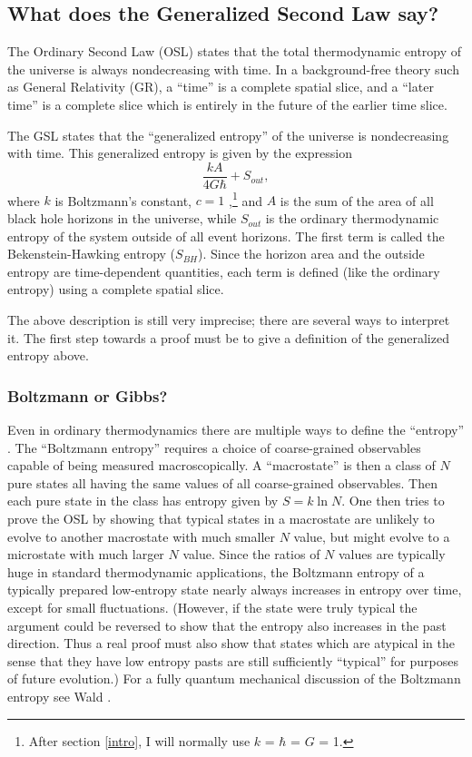 \documentclass[12pt]{article}
\begin{document}
\subsection{What does the Generalized Second Law say?}\label{def}

The Ordinary Second Law (OSL) states that the total thermodynamic entropy of the universe is always nondecreasing with time.  In a background-free theory such as General Relativity (GR), a ``time'' is a complete spatial slice, and a ``later time'' is a complete slice which is entirely in the future of the earlier time slice.

The GSL states that the ``generalized entropy'' of the universe is nondecreasing with time.  This generalized entropy is given by the expression
\begin{equation}\label{Gen}
\frac{kA}{4G \hbar} + S_{out},
\end{equation}
where $k$ is Boltzmann's constant, $c = 1$ \cite{hawking75},\footnote{After section \ref{intro}, I will normally use $k$ = $\hbar$ = $G$ = 1.} and $A$ is the sum of the area of all black hole horizons in the universe, while $S_{out}$ is the ordinary thermodynamic entropy of the system outside of all event horizons.  The first term is called the Bekenstein-Hawking entropy ($S_{BH}$).  Since the horizon area and the outside entropy are time-dependent quantities, each term is defined (like the ordinary entropy) using a complete spatial slice.

The above description is still very imprecise; there are several ways to interpret it.  The first step towards a proof must be to give a definition of the generalized entropy above.

\subsubsection{Boltzmann or Gibbs?}\label{borg}

Even in ordinary thermodynamics there are multiple ways to define the ``entropy'' \cite{jaynes65}.  The ``Boltzmann entropy'' requires a choice of coarse-grained observables capable of being measured macroscopically.  A ``macro\-state'' is then a class of $N$ pure states all having the same values of all coarse-grained observables.  Then each pure state in the class has entropy given by 
$S = k\ln N$.  One then tries to prove the OSL by showing that typical states in a macrostate are unlikely to evolve to  another macrostate with much smaller $N$ value, but might evolve to a microstate with much larger $N$ value.  Since the ratios of $N$ values are typically huge in standard thermodynamic applications, the Boltzmann entropy of a typically prepared low-entropy state nearly always increases in entropy over time, except for small fluctuations.  (However, if the state were truly typical the argument could be reversed to show that the entropy also increases in the past direction.  Thus a real proof must also show that states which are atypical in the sense that they have low entropy pasts are still sufficiently ``typical'' for purposes of future evolution.)  For a fully quantum mechanical discussion of the Boltzmann entropy see Wald \cite{wald79}.
\end{document}
